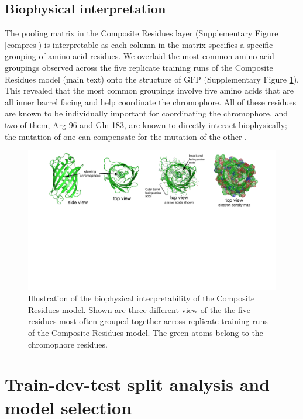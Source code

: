 \subsection{Biophysical interpretation}

The pooling matrix in the Composite Residues layer (Supplementary Figure \ref{compres}) is interpretable as each column in the matrix specifies a specific grouping of amino acid residues. We overlaid the most common amino acid groupings observed across the five replicate training runs of the Composite Residues model (main text) onto the structure of GFP (Supplementary Figure \ref{compres-interpret}). This revealed that the most common groupings involve five amino acids that are all inner barrel facing and help coordinate the chromophore. All of these residues are known to be individually important for coordinating the chromophore, and two of them, Arg 96 and Gln 183, are known to directly interact biophysically; the mutation of one can compensate for the mutation of the other \cite{wood2005defining}. 

\begin{figure}[t!]
  \includegraphics[width=1\linewidth,page=8,trim={1cm 3cm 1cm 0}]{figures/2018-05-09-NIPS_2018_Figures.pdf}
  \caption[Illustration of the biophysical interpretability of the Composite Residues model]{Illustration of the biophysical interpretability of the Composite Residues model. Shown are three different view of the the five residues most often grouped together across replicate training runs of the Composite Residues model. The green atoms belong to the chromophore residues.}
  \label{compres-interpret}
\end{figure}

\section{Train-dev-test split analysis and model selection}
\label{sec:tts}

